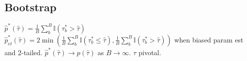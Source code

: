 \subsection*{Bootstrap}
$\hat{p}^{\ast}(\hat{\tau}) = \frac{1}{B} \sum_{b}^{B} \mathbb{I}(\tau_{b}^{\ast} > \hat{\tau})$\\
$\hat{p}^{\ast}_{et}(\hat{\tau}) = 2 \min \left( \frac{1}{B} \sum_{b}^{B} \mathbb{I} (\tau_{b}^{\ast} \leq \hat{\tau}), \frac{1}{B} \sum_{b}^{B} \mathbb{I} (\tau_{b}^{\ast} > \hat{\tau}) \right)$ when biased param est and 2-tailed.
$\hat{p}^{\ast}(\hat{\tau}) \rightarrow p(\hat{\tau})$ as $B \rightarrow \infty$. $\tau$ pivotal.

